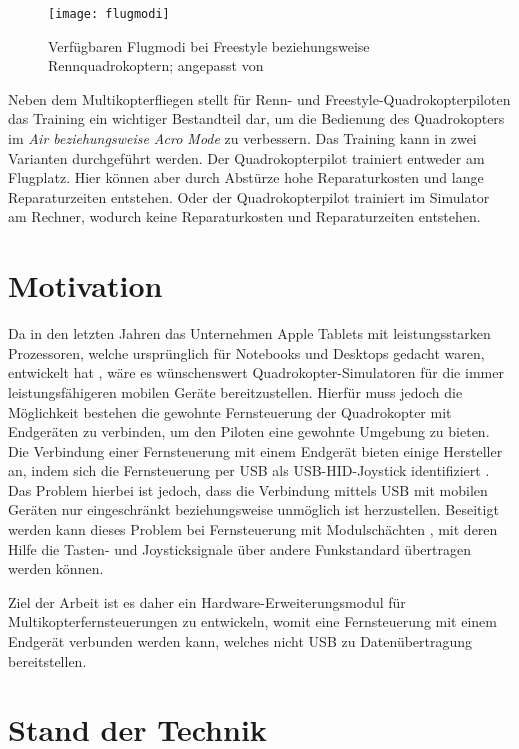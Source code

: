 \begin{figure}[h]
    \centering
    \texttt{[image: flugmodi]}
    \caption{Verfügbaren Flugmodi bei Freestyle beziehungsweise Rennquadrokoptern; angepasst von \cite{betafpvFlugmodi}}
    \label{fig:flugmodi}
\end{figure}

Neben dem Multikopterfliegen stellt für Renn- und Freestyle-Quadrokopterpiloten das Training ein wichtiger Bestandteil dar, um die Bedienung des Quadrokopters im \textit{Air beziehungsweise Acro Mode} zu verbessern. Das Training kann in zwei Varianten durchgeführt werden. Der Quadrokopterpilot trainiert entweder am Flugplatz. Hier können aber durch Abstürze hohe Reparaturkosten und lange Reparaturzeiten entstehen. Oder der Quadrokopterpilot trainiert im Simulator am Rechner, wodurch keine Reparaturkosten und Reparaturzeiten entstehen.

\section{Motivation}

Da in den letzten Jahren das Unternehmen Apple Tablets mit leistungsstarken Prozessoren, welche ursprünglich für Notebooks und Desktops gedacht waren, entwickelt hat \cite{appleM2IPad}, wäre es wünschenswert Quadrokopter-Simulatoren für die immer leistungsfähigeren mobilen Geräte bereitzustellen. Hierfür muss jedoch die Möglichkeit bestehen die gewohnte Fernsteuerung der Quadrokopter mit Endgeräten zu verbinden, um den Piloten eine gewohnte Umgebung zu bieten. Die Verbindung einer Fernsteuerung mit einem Endgerät bieten einige Hersteller an, indem sich die Fernsteuerung per USB als USB-\acs{HID}-Joystick identifiziert \cite{opentxJoystick}. Das Problem hierbei ist jedoch, dass die Verbindung mittels USB mit mobilen Geräten nur eingeschränkt beziehungsweise unmöglich ist herzustellen. Beseitigt werden kann dieses Problem bei Fernsteuerung mit Modulschächten \cite{opentxModulbay}, mit deren Hilfe  die Tasten- und Joysticksignale über andere Funkstandard übertragen werden können.

Ziel der Arbeit ist es daher ein Hardware-Erweiterungsmodul für Multikopterfernsteuerungen zu entwickeln, womit eine Fernsteuerung mit einem Endgerät verbunden werden kann, welches nicht USB zu Datenübertragung bereitstellen.

\section{Stand der Technik}

